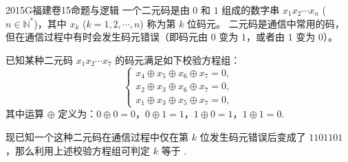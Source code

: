 
\begin{problem}{2015}{G}{福建卷}{15}{命题与逻辑}
一个二元码是由 $ 0 $ 和 $ 1 $ 组成的数字串 $ x_1x_2\cdots x_n $ ($ n\in\mathbb{N}^* $)，其中 $ x_k $ ($ k=1,2,\cdots,n $) 称为第 $ k $ 位码元。  
二元码是通信中常用的码，但在通信过程中有时会发生码元错误（即码元由 $ 0 $ 变为 $ 1 $，或者由 $ 1 $ 变为 $ 0 $）。  

已知某种二元码 $ x_1x_2\cdots x_7 $ 的码元满足如下校验方程组：  
$$
\begin{cases}
x_4\oplus x_5\oplus x_6\oplus x_7=0,\\
x_2\oplus x_3\oplus x_6\oplus x_7=0,\\
x_1\oplus x_3\oplus x_5\oplus x_7=0,
\end{cases}
$$  
其中运算 $ \oplus $ 定义为：$ 0\oplus 0=0 $，$ 0\oplus 1=1 $，$ 1\oplus 0=1 $，$ 1\oplus 1=0 $.  

现已知一个这种二元码在通信过程中仅在第 $ k $ 位发生码元错误后变成了 $ 1101101 $，那么利用上述校验方程组可判定 $ k $ 等于 \underline{\hspace{4em}}.
\end{problem}

\begin{answer}

\end{answer}

\begin{solutions}

\end{solutions}